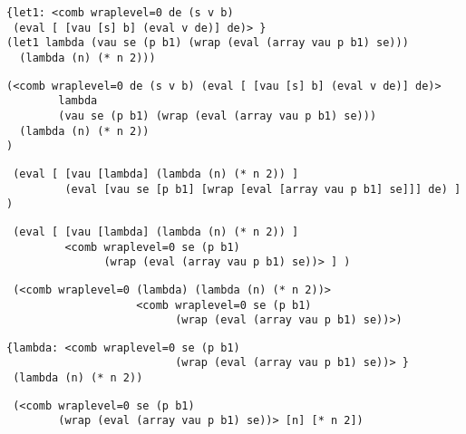 \documentclass{beamer}
\begin{document}
\begin{frame}[fragile]
\footnotesize
\begin{verbatim}
{let1: <comb wraplevel=0 de (s v b)
 (eval [ [vau [s] b] (eval v de)] de)> }
(let1 lambda (vau se (p b1) (wrap (eval (array vau p b1) se)))
  (lambda (n) (* n 2)))
\end{verbatim}
\end{frame}

\begin{frame}[fragile]
\footnotesize
\begin{verbatim}
(<comb wraplevel=0 de (s v b) (eval [ [vau [s] b] (eval v de)] de)>
		lambda
		(vau se (p b1) (wrap (eval (array vau p b1) se)))
  (lambda (n) (* n 2))
)
\end{verbatim}
\end{frame}

\begin{frame}[fragile]
\footnotesize
\begin{verbatim}
 (eval [ [vau [lambda] (lambda (n) (* n 2)) ]
	   	 (eval [vau se [p b1] [wrap [eval [array vau p b1] se]]] de) ] )
\end{verbatim}
\end{frame}

\begin{frame}[fragile]
\footnotesize
\begin{verbatim}
 (eval [ [vau [lambda] (lambda (n) (* n 2)) ]
         <comb wraplevel=0 se (p b1)
               (wrap (eval (array vau p b1) se))> ] )
\end{verbatim}
\end{frame}

\begin{frame}[fragile]
\footnotesize
\begin{verbatim}
 (<comb wraplevel=0 (lambda) (lambda (n) (* n 2))>
                    <comb wraplevel=0 se (p b1)
                          (wrap (eval (array vau p b1) se))>)
\end{verbatim}
\end{frame}

\begin{frame}[fragile]
\footnotesize
\begin{verbatim}
{lambda: <comb wraplevel=0 se (p b1)
                          (wrap (eval (array vau p b1) se))> }
 (lambda (n) (* n 2))
\end{verbatim}
\end{frame}

\begin{frame}[fragile]
\footnotesize
\begin{verbatim}
 (<comb wraplevel=0 se (p b1)
        (wrap (eval (array vau p b1) se))> [n] [* n 2])
\end{verbatim}
\end{frame}
\end{document}
